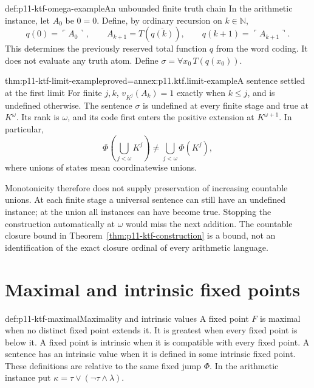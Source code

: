 \begin{hbdefinition}{def:p11-ktf-omega-example}{An unbounded finite truth chain}
In the arithmetic instance, let \(A_0\) be \(0=0\). Define, by ordinary
recursion on \(k\in\mathbb N\),
\[
 q(0)=\ulcorner A_0\urcorner,\qquad
 A_{k+1}=T(\overline{q(k)}),\qquad
 q(k+1)=\ulcorner A_{k+1}\urcorner.
\]
This determines the previously reserved total function \(q\) from the
word coding. It does not evaluate any truth atom. Define
\(\sigma=\forall x_0\,T(q(x_0))\).
\end{hbdefinition}

\begin{hbtheorem}{thm:p11-ktf-limit-example}{proved=annex:p11.ktf.limit-example}{A sentence settled at the first limit}
For finite \(j,k\), \(v_{K^j}(A_k)=1\) exactly when \(k\leq j\),
and is undefined otherwise. The sentence \(\sigma\) is undefined at
every finite stage and true at \(K^\omega\). Its rank is \(\omega\),
and its code first enters the positive extension at \(K^{\omega+1}\).
In particular,
\[
 \Phi\left(\bigcup_{j<\omega}K^j\right)
 \ne \bigcup_{j<\omega}\Phi(K^j),
\]
where unions of states mean coordinatewise unions.
\end{hbtheorem}

Monotonicity therefore does not supply preservation of increasing countable
unions. At each finite stage a universal sentence can still have an
undefined instance; at the union all instances can have become true.
Stopping the construction automatically at \(\omega\) would miss the
next addition. The countable closure bound in
Theorem~\ref{thm:p11-ktf-construction} is a bound, not an identification
of the exact closure ordinal of every arithmetic language.

\section{Maximal and intrinsic fixed points}

\begin{hbdefinition}{def:p11-ktf-maximal}{Maximality and intrinsic values}
A fixed point \(F\) is maximal when no distinct fixed point extends it.
It is greatest when every fixed point is below it. A fixed point is
intrinsic when it is compatible with every fixed point. A sentence has an
intrinsic value when it is defined in some intrinsic fixed point.
These definitions are relative to the same fixed jump \(\Phi\).
In the arithmetic instance put
\(\kappa=\tau\lor(\neg\tau\land\lambda)\).
\end{hbdefinition}

